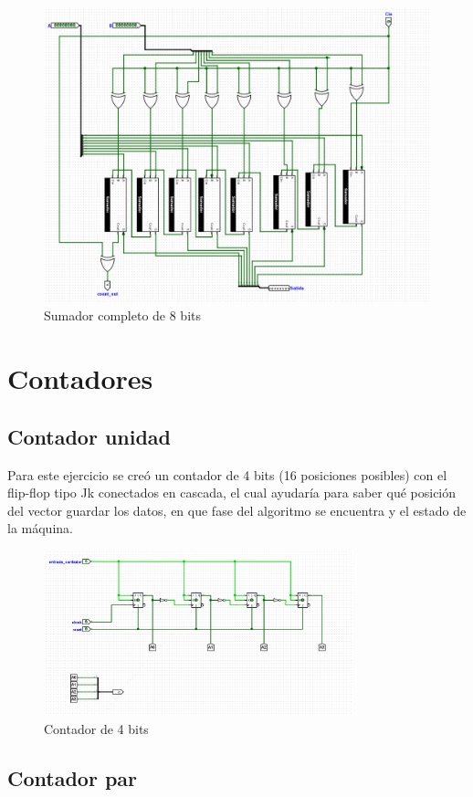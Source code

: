 \documentclass{article}
\begin{document}
\begin{figure}[h]
\begin{minipage}{0.45\textwidth}
      \includegraphics[width=\linewidth]{imagenes/sumador8.png} %
      \caption{Sumador completo de 8 bits}
      \label{fig:sumador8}
    \end{minipage}
\end{figure}

\section{Contadores}
\subsection{Contador unidad}
Para este ejercicio se creó un contador de 4 bits (16 posiciones posibles) con el flip-flop tipo Jk 
conectados en cascada, el cual ayudaría para saber qué posición del vector guardar los datos, en que 
fase del algoritmo se encuentra y el estado de la máquina.
\begin{figure}[h] %
    \centering
    \includegraphics[width=0.8\textwidth]{imagenes/contador.png} %
    \caption{Contador de 4 bits} %
    \label{fig:contador} %
\end{figure}

\subsection{Contador par}
\end{document}
